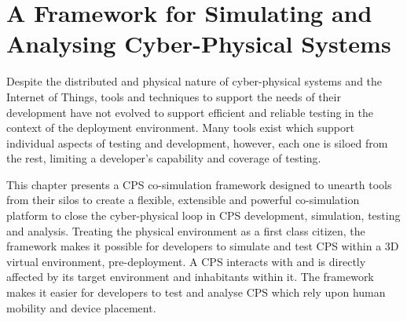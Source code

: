 \chapter{A Framework for Simulating and Analysing Cyber-Physical Systems}
\label{chap:framework}






Despite the distributed and physical nature of cyber-physical systems and the Internet of Things, tools and techniques to support the needs of their development have not evolved to support efficient and reliable testing in the context of the deployment environment. Many tools exist which support individual aspects of testing and development, however, each one is siloed from the rest, limiting a developer's capability and coverage of testing.

This chapter presents a CPS co-simulation framework designed to unearth tools from their silos to create a flexible, extensible and powerful co-simulation platform to close the cyber-physical loop in CPS development, simulation, testing and analysis. Treating the physical environment as a first class citizen, the framework makes it possible for developers to simulate and test CPS within a 3D virtual environment, pre-deployment. A CPS interacts with and is directly affected by its target environment and inhabitants within it. The framework makes it easier for developers to test and analyse CPS which rely upon human mobility and device placement.


